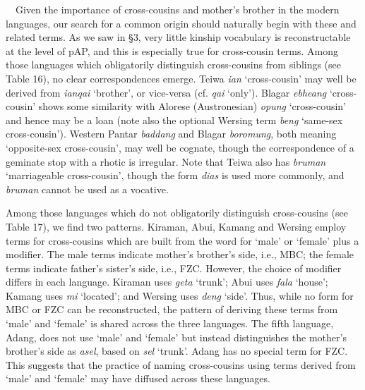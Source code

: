 \ \ Given the importance of cross-cousins and mother{\textquoteright}s brother in the modern languages, our search for a common origin should naturally begin with these and related terms. As we saw in {\S}3, very little kinship vocabulary is reconstructable at the level of pAP, and this is especially true for cross-cousin terms. Among those languages which obligatorily distinguish cross-cousins from siblings (see Table 16), no clear correspondences emerge. Teiwa \textit{ian} {\textquoteleft}cross-cousin{\textquoteright} may well be derived from \textit{ianqai} {\textquoteleft}brother{\textquoteright}, or vice-versa (cf. \textit{qai }{\textquoteleft}only{\textquoteright}). Blagar \textit{ebheang }{\textquoteleft}cross-cousin{\textquoteright} shows some similarity with Alorese (Austronesian) \textit{opung} {\textquoteleft}cross-cousin{\textquoteright} and hence may be a loan (note also the optional Wersing term \textit{beng }{\textquoteleft}same-sex cross-cousin{\textquoteright}). Western Pantar \textit{
baddang} and Blagar \textit{boromung}, both meaning {\textquoteleft}opposite-sex cross-cousin{\textquoteright}, may well be cognate, though the correspondence of a geminate stop with a rhotic is irregular. Note that Teiwa also has \textit{bruman} {\textquoteleft}marriageable cross-cousin{\textquoteright}, though the form \textit{dias} is used more commonly, and \textit{bruman} cannot be used as a vocative.  

Among those languages which do not obligatorily distinguish cross-cousins (see Table 17), we find two patterns. Kiraman, Abui, Kamang and Wersing employ terms for cross-cousins which are built from the word for {\textquoteleft}male{\textquoteright} or {\textquoteleft}female{\textquoteright} plus a modifier. The male terms indicate mother{\textquoteright}s brother{\textquoteright}s side, i.e., MBC; the female terms indicate father{\textquoteright}s sister{\textquoteright}s side, i.e., FZC. However, the choice of modifier differs in each language. Kiraman uses \textit{geta }{\textquoteleft}trunk{\textquoteright}; Abui uses \textit{fala }{\textquoteleft}house{\textquoteright}; Kamang uses \textit{mi }{\textquoteleft}located{\textquoteright}; and Wersing uses \textit{deng} {\textquoteleft}side{\textquoteright}. Thus, while no form for MBC or FZC can be reconstructed, the pattern of deriving these terms from {\textquoteleft}male{\textquoteright} and {\textquoteleft}female{\textquoteright} is shared across the 
three languages. The fifth language, Adang, does not use {\textquoteleft}male{\textquoteright} and {\textquoteleft}female{\textquoteright} but instead distinguishes the mother{\textquoteright}s brother{\textquoteright}s side as \textit{asel}, based on \textit{sel }{\textquoteleft}trunk{\textquoteright}. Adang has no special term for FZC. This suggests that the practice of naming cross-cousins using terms derived from {\textquoteleft}male{\textquoteright} and {\textquoteleft}female{\textquoteright} may have diffused across these languages.

